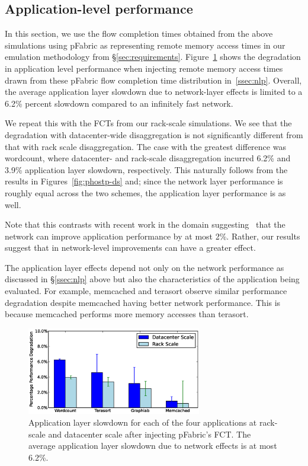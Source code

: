 \subsection{Application-level performance}
\label{ssec:alp}

In this section, we use the flow completion times obtained from the above simulations using pFabric as representing remote memory access times in our emulation 
methodology from \S\ref{sec:requirements}.
Figure~\ref{fig:appfabric} shows the degradation in application level performance when injecting remote memory access times drawn from these pFabric flow completion time distribution in~\ref{ssec:nlp}. Overall, the average application layer slowdown due to network-layer effects is limited to a 6.2\% percent slowdown compared to an infinitely fast network. 

We repeat this with the FCTs from our rack-scale simulations. We see that the degradation with datacenter-wide disaggregation is not significantly different from that with rack scale disaggregation. The case with the greatest difference was wordcount, where datacenter- and rack-scale disaggregation incurred 6.2\% and 3.9\% application layer slowdown, respectively. This naturally follows from the results in Figures~\ref{fig:phostp-ds} and; since the network layer performance is roughly equal across the two schemes, the application layer performance is as well. 



Note that this contrasts with recent work in the \pdis domain suggesting~\cite{kay-nsdi15} that the network can improve application performance by at most 2\%. Rather, our results suggest that in \dis network-level improvements can have a greater effect.

The application layer effects depend not only on the network performance as discussed in \S\ref{ssec:nlp} above but also the characteristics of the application being evaluated. For example, memcached and terasort observe similar performance degradation despite memcached having better network performance. 
This is because memcached performs more memory accesses than terasort. 

%
\begin{figure}
  \centering
    \includegraphics[width = 3in]{img/slowdown.eps} 
  \caption{\small{Application layer slowdown for each of the four applications at rack-scale and datacenter scale after injecting pFabric's FCT. The average application layer slowdown due to network effects is at most 6.2\%.}}
  \label{fig:appfabric}
\end{figure}
%

